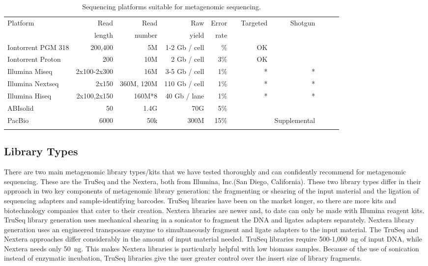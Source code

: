 \documentclass[graybox]{svmult}
\begin{document}
\begin{table}
\caption{Sequencing platforms suitable for metagenomic sequencing.}
\begin{tabular}{lrrrrrrrrrr}
Platform &  Read & Read & Raw   & Error &       &  Targeted & Shotgun  \\
      & length & number & yield &  rate &       &           &         \\
Iontorrent PGM 318 &  200,400 & 5M & 1-2 Gb / cell & \% &  & OK &   \\
Iontorrent Proton &  200 & 10M & 2 Gb / cell & 3\% &  & OK &   \\
Illumina Miseq &  2x100-2x300 & 16M & 3-5 Gb / cell & 1\% &  & * & * \\
Illumina Nextseq &  2x150 & 360M, 120M & 110 Gb / cell & 1\% &  & * & * \\
Illumina Hiseq & 2x100,2x150 & 160M*8 & 40 Gb / lane & 1\% &  & * & * \\
ABIsolid & 50 & 1.4G & 70G & 5\% &  &  &   \\
PacBio &  6000 & 50k &300M  & 15\% &  &  & Supplemental  \\
  \\
\end{tabular}
\end{table}



\subsection{Library Types}
There are two main metagenomic library types/kits that we have tested thoroughly and can confidently recommend for metagenomic sequencing.  These are the TruSeq and the Nextera, both from Illumina, Inc.(San Diego, California). These two library types differ in their approach in two key components of metagenomic library generation: the fragmenting or shearing of the input material and the ligation of sequencing adapters and sample-identifying barcodes.  TruSeq libraries have been on the market longer, so there are more kits and biotechnology companies that cater to their creation. 
Nextera libraries are newer and, to date can only be made with Illumina reagent kits. 
% 
TruSeq library generation uses mechanical shearing in a sonicator to fragment the DNA and ligates adapters separately. 
Nextera library generation uses an engineered transposase enzyme to simultaneously fragment and ligate adapters to the input material. 
%
The TruSeq and Nextera approaches differ considerably in the amount of input material needed. TruSeq libraries require 500-1,000~ng of input DNA, while Nextera needs only 50~ng.  This makes Nextera libraries is particularly helpful with low biomass samples.
Because of the use of sonication instead of enzymatic incubation, TruSeq libraries give the user greater control over the insert size of library fragments.  
\end{document}
